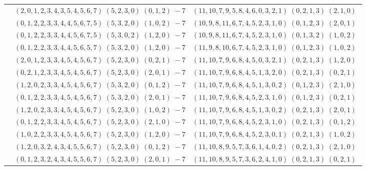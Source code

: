 \documentclass[11pt]{article}
\begin{document}
\begin{longtable}[l]{|c|c|c|}
 \cline{2-3} 
 & $(2 ,0 ,1 ,2 ,3 ,4 ,3 ,5 ,4 ,5 ,6 ,7) \;(5 ,2 ,3 ,0) \;(0 ,1 ,2) \;-7$ & $(11 ,10 ,7 ,9 ,5 ,8 ,4 ,6 ,0 ,3 ,2 ,1) \;(0 ,2 ,1 ,3) \;(2 ,1 ,0) \;$\\ 
 \cline{2-3} 
 & $(0 ,1 ,2 ,2 ,3 ,3 ,4 ,4 ,5 ,6 ,7 ,5) \;(5 ,3 ,2 ,0) \;(1 ,0 ,2) \;-7$ & $(10 ,9 ,8 ,11 ,6 ,7 ,4 ,5 ,2 ,3 ,1 ,0) \;(0 ,1 ,2 ,3) \;(2 ,0 ,1) \;$\\ 
 \cline{2-3} 
 & $(0 ,1 ,2 ,2 ,3 ,3 ,4 ,4 ,5 ,6 ,7 ,5) \;(5 ,3 ,0 ,2) \;(1 ,2 ,0) \;-7$ & $(10 ,9 ,8 ,11 ,6 ,7 ,4 ,5 ,2 ,3 ,1 ,0) \;(0 ,1 ,3 ,2) \;(1 ,0 ,2) \;$\\ 
 \cline{2-3} 
 & $(0 ,1 ,2 ,2 ,3 ,3 ,4 ,4 ,5 ,6 ,5 ,7) \;(5 ,3 ,2 ,0) \;(1 ,2 ,0) \;-7$ & $(11 ,9 ,8 ,10 ,6 ,7 ,4 ,5 ,2 ,3 ,1 ,0) \;(0 ,1 ,2 ,3) \;(1 ,0 ,2) \;$\\ 
 \cline{2-3} 
 & $(2 ,0 ,1 ,2 ,3 ,3 ,4 ,5 ,4 ,5 ,6 ,7) \;(5 ,2 ,3 ,0) \;(0 ,2 ,1) \;-7$ & $(11 ,10 ,7 ,9 ,6 ,8 ,4 ,5 ,0 ,3 ,2 ,1) \;(0 ,2 ,1 ,3) \;(1 ,2 ,0) \;$\\ 
 \cline{2-3} 
 & $(0 ,2 ,1 ,2 ,3 ,3 ,4 ,5 ,4 ,5 ,6 ,7) \;(5 ,2 ,3 ,0) \;(2 ,0 ,1) \;-7$ & $(11 ,10 ,7 ,9 ,6 ,8 ,4 ,5 ,1 ,3 ,2 ,0) \;(0 ,2 ,1 ,3) \;(0 ,2 ,1) \;$\\ 
 \cline{2-3} 
 & $(1 ,2 ,0 ,2 ,3 ,3 ,4 ,5 ,4 ,5 ,6 ,7) \;(5 ,3 ,2 ,0) \;(0 ,1 ,2) \;-7$ & $(11 ,10 ,7 ,9 ,6 ,8 ,4 ,5 ,1 ,3 ,0 ,2) \;(0 ,1 ,2 ,3) \;(2 ,1 ,0) \;$\\ 
 \cline{2-3} 
 & $(0 ,1 ,2 ,2 ,3 ,3 ,4 ,5 ,4 ,5 ,6 ,7) \;(5 ,3 ,2 ,0) \;(2 ,0 ,1) \;-7$ & $(11 ,10 ,7 ,9 ,6 ,8 ,4 ,5 ,2 ,3 ,1 ,0) \;(0 ,1 ,2 ,3) \;(0 ,2 ,1) \;$\\ 
 \cline{2-3} 
 & $(1 ,2 ,0 ,2 ,3 ,3 ,4 ,5 ,4 ,5 ,6 ,7) \;(5 ,2 ,3 ,0) \;(1 ,0 ,2) \;-7$ & $(11 ,10 ,7 ,9 ,6 ,8 ,4 ,5 ,1 ,3 ,0 ,2) \;(0 ,2 ,1 ,3) \;(2 ,0 ,1) \;$\\ 
 \cline{2-3} 
 & $(0 ,1 ,2 ,2 ,3 ,3 ,4 ,5 ,4 ,5 ,6 ,7) \;(5 ,2 ,3 ,0) \;(2 ,1 ,0) \;-7$ & $(11 ,10 ,7 ,9 ,6 ,8 ,4 ,5 ,2 ,3 ,1 ,0) \;(0 ,2 ,1 ,3) \;(0 ,1 ,2) \;$\\ 
 \cline{2-3} 
 & $(1 ,0 ,2 ,2 ,3 ,3 ,4 ,5 ,4 ,5 ,6 ,7) \;(5 ,2 ,3 ,0) \;(1 ,2 ,0) \;-7$ & $(11 ,10 ,7 ,9 ,6 ,8 ,4 ,5 ,2 ,3 ,0 ,1) \;(0 ,2 ,1 ,3) \;(1 ,0 ,2) \;$\\ 
 \cline{2-3} 
 & $(1 ,2 ,0 ,3 ,2 ,4 ,3 ,4 ,5 ,5 ,6 ,7) \;(5 ,2 ,3 ,0) \;(0 ,1 ,2) \;-7$ & $(11 ,10 ,8 ,9 ,5 ,7 ,3 ,6 ,1 ,4 ,0 ,2) \;(0 ,2 ,1 ,3) \;(2 ,1 ,0) \;$\\ 
 \cline{2-3} 
 & $(0 ,1 ,2 ,3 ,2 ,4 ,3 ,4 ,5 ,5 ,6 ,7) \;(5 ,2 ,3 ,0) \;(2 ,0 ,1) \;-7$ & $(11 ,10 ,8 ,9 ,5 ,7 ,3 ,6 ,2 ,4 ,1 ,0) \;(0 ,2 ,1 ,3) \;(0 ,2 ,1) \;$\\ 

\end{longtable}
\end{document}
